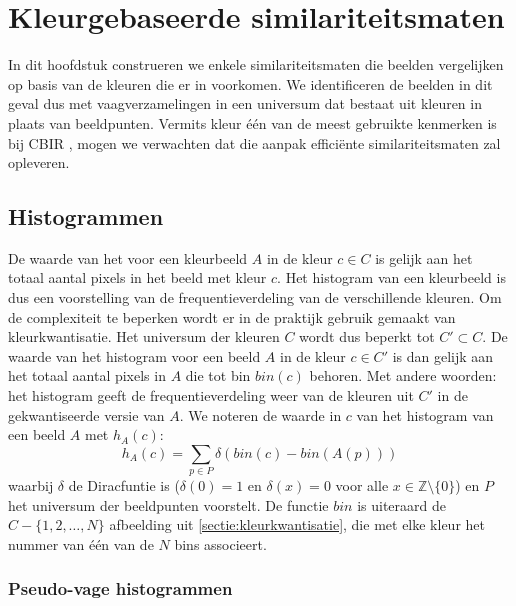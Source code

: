 \chapter{Kleurgebaseerde similariteitsmaten}

In dit hoofdstuk construeren we enkele similariteitsmaten die beelden 
vergelijken op basis van de kleuren die er in voorkomen. We identificeren de beelden
in dit geval dus met vaagverzamelingen in een universum dat bestaat uit kleuren 
in plaats van beeldpunten. Vermits kleur \'e\'en  van de meest gebruikte kenmerken is bij CBIR 
\cite{rui:image_retr, schettini:survey_of_methods_for_colour_image_indexing_and_retrieval}, mogen we 
verwachten dat die  aanpak effici\"ente 
similariteitsmaten zal opleveren. 

\section{Histogrammen}

De waarde van het  voor een kleurbeeld 
$A$ in de kleur $c \in C$ is gelijk aan het totaal aantal pixels in het beeld met 
kleur $c$. Het histogram van een kleurbeeld is dus een voorstelling van de frequentieverdeling 
van de verschillende kleuren.  Om de complexiteit te beperken wordt er in de praktijk gebruik gemaakt
van kleurkwantisatie. Het universum der kleuren $C$ wordt dus beperkt tot $C' \subset C$. 
De waarde van het histogram voor een beeld $A$ in de kleur $c \in C'$ is dan gelijk aan 
het totaal aantal pixels in $A$ die tot bin $bin(c)$ behoren. Met andere woorden: het histogram 
geeft de frequentieverdeling weer van de kleuren uit $C'$ in de gekwantiseerde versie van 
$A$. We noteren de waarde in $c$ van het histogram van een beeld $A$ met $h_A(c)$: 
\begin{displaymath}
h_A(c) = \sum_{p \in P} \delta (bin(c) - bin(A(p))) 
\end{displaymath} 
waarbij $\delta$ de Diracfuntie is ($\delta (0)=1$ en $\delta (x)=0$ voor alle 
$x \in \mathbb{Z} \setminus \{0\}$) en $P$ het universum der beeldpunten 
voorstelt. De functie $bin$ is uiteraard de $C - \{1,2,\ldots,N\}$ afbeelding 
uit \ref{sectie:kleurkwantisatie}, die met 
elke kleur het nummer van \'e\'en van de $N$ bins associeert. 


\subsection{Pseudo-vage histogrammen}

